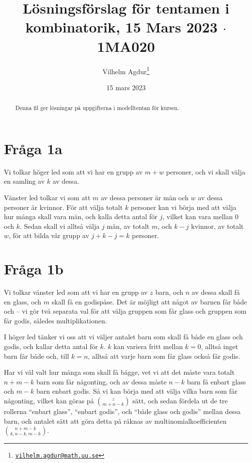 \documentclass[nobib]{tufte-handout}
\title{Lösningsförslag för tentamen i kombinatorik, 15 Mars 2023 $\cdot$ 1MA020}
\author[Vilhelm Agdur]{Vilhelm Agdur\thanks{\href{mailto:vilhelm.agdur@math.uu.se}{\nolinkurl{vilhelm.agdur@math.uu.se}}}}
\date{15 mars 2023}
\begin{document}

\maketitle%

\begin{abstract}
\noindent

Denna fil ger lösningar på uppgifterna i modelltentan för kursen.
\end{abstract}

\section{Fråga 1a}

Vi tolkar höger led som att vi har en grupp av $m + w$ personer, och vi skall välja en samling av $k$ av dessa.

Vänster led tolkar vi som att $m$ av dessa personer är män och $w$ av dessa personer är kvinnor. För att välja totalt $k$ personer kan vi börja med att välja hur många skall vara män, och kalla detta antal för $j$, vilket kan vara mellan $0$ och $k$. Sedan skall vi alltså välja $j$ män, av totalt $m$, och $k - j$ kvinnor, av totalt $w$, för att bilda vår grupp av $j + k - j = k$ personer.

\section{Fråga 1b}

Vi tolkar vänster led som att vi har en grupp av $z$ barn, och $n$ av dessa skall få en glass, och $m$ skall få en godispåse. Det är möjligt att något av barnen får både och -- vi gör två separata val för att välja gruppen som får glass och gruppen som får godis, således multiplikationen.

I höger led tänker vi oss att vi väljer antalet barn som skall få både en glass och godis, och kallar detta antal för $k$. $k$ kan variera fritt mellan $k = 0$, alltså inget barn får både och, till $k = n$, alltså att varje barn som får glass också får godis.

Har vi väl valt hur många som skall få bägge, vet vi att det måste vara totalt $n + m - k$ barn som får någonting, och av dessa måste $n - k$ barn få enbart glass och $m - k$ barn enbart godis. Så vi kan börja med att välja vilka barn som får någonting, vilket kan göras på $\binom{z}{m + n - k}$ sätt, och sedan fördela ut de tre rollerna ``enbart glass'', ``enbart godis'', och ``både glass och godis'' mellan dessa barn, och antalet sätt att göra detta på räknas av multinomialkoefficienten $\binom{n + m - k}{k, n-k, m-k}$.
\end{document}
